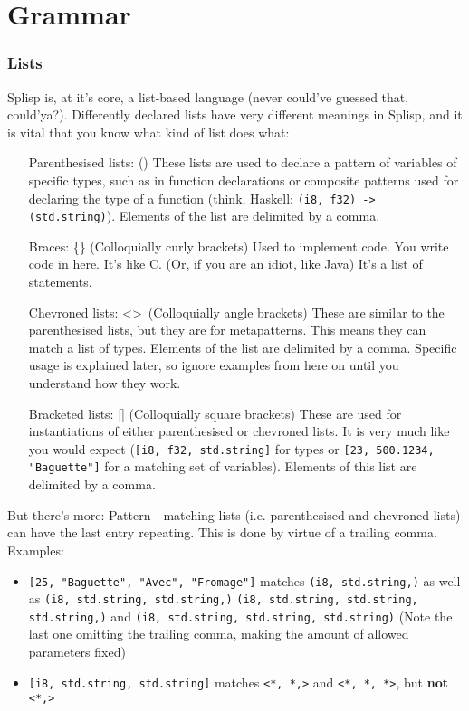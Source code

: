 \documentclass{scrartcl}
\begin{document}

\part{Grammar}

\section{Lists}

Splisp is, at it's core, a list-based language (never could've guessed that, could'ya?). Differently declared lists have very different meanings in Splisp, and it is vital that you know what kind of list does what:

\begin{itemize}
	\item[Parenthesised lists:] () \newline
	These lists are used to declare a pattern of variables of specific types, such as in function declarations or composite patterns used for declaring the type of a function (think, Haskell: \lstinline|(i8, f32) -> (std.string)|). Elements of the list are delimited by a comma.
	\item[Braces:] \{\} (Colloquially curly brackets) \newline
	Used to implement code. You write code in here. It's like C. (Or, if you are an idiot, like Java) It's a list of statements.
	\item[Chevroned lists:] \textless\textgreater\ (Colloquially angle brackets) \newline
	These are similar to the parenthesised lists, but they are for metapatterns. This means they can match a list of types. Elements of the list are delimited by a comma. Specific usage is explained later, so ignore examples from here on until you understand how they work.
	\item[Bracketed lists:] [] (Colloquially square brackets) \newline
	These are used for instantiations of either parenthesised or chevroned lists. It is very much like you would expect (\lstinline|[i8, f32, std.string]| for types or \lstinline|[23, 500.1234, "Baguette"]| for a matching set of variables). Elements of this list are delimited by a comma.
\end{itemize}

But there's more: Pattern - matching lists (i.e. parenthesised and chevroned lists) can have the last entry repeating. This is done by virtue of a trailing comma. Examples:
\begin{itemize}
	\item \lstinline|[25, "Baguette", "Avec", "Fromage"]| matches \lstinline|(i8, std.string,)| as well as \lstinline|(i8, std.string, std.string,)| \lstinline|(i8, std.string, std.string, std.string,)| and \lstinline|(i8, std.string, std.string, std.string)| (Note the last one omitting the trailing comma, making the amount of allowed parameters fixed)
	\item \lstinline|[i8, std.string, std.string]| matches \lstinline|<*, *,>| and \lstinline|<*, *, *>|, but \textbf{not} \lstinline|<*,>|
\end{itemize}
\end{document}
